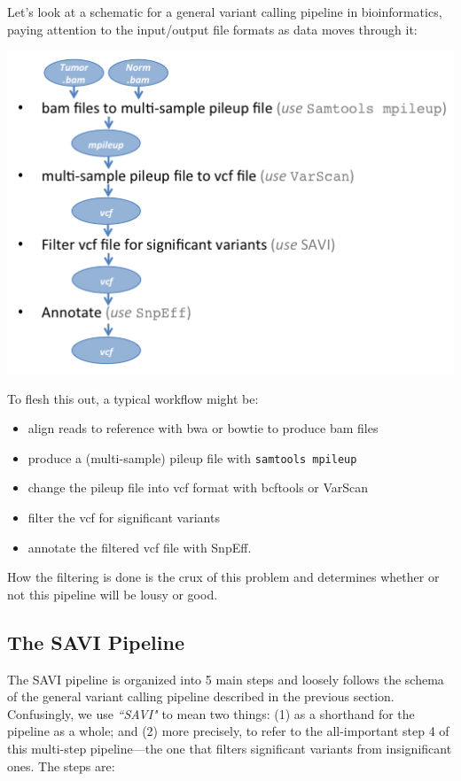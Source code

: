 \documentclass[letterpaper,14pt]{memoir}
\begin{document}
Let's look at a schematic for a general variant calling pipeline in bioinformatics, paying attention to the input/output file formats as data moves through it:

\begin{flushright}
\includegraphics[scale=0.75]{pipeline_507.png}
\end{flushright}

\noindent To flesh this out, a typical workflow might be:

\begin{itemize}
\tightlist
\item
  align reads to reference with bwa or bowtie to produce bam files
\item
  produce a (multi-sample) pileup file with \texttt{samtools mpileup}
\item
  change the pileup file into vcf format with bcftools or VarScan
\item
  filter the vcf for significant variants
\item
  annotate the filtered vcf file with SnpEff.
\end{itemize}

\noindent How the filtering is done is the crux of this problem and determines whether or not this pipeline will be lousy or good.
  
\subsection{The SAVI Pipeline}\label{The SAVI Pipeline}

The SAVI pipeline is organized into 5 main steps and loosely follows the schema of the general variant calling pipeline described in the previous section. Confusingly, we use \textit{``SAVI"} to mean two things: (1) as a shorthand for the pipeline as a whole; and (2) more precisely, to refer to the all-important step 4 of this multi-step pipeline---the one that filters significant variants from insignificant ones. The steps are:
\end{document}
